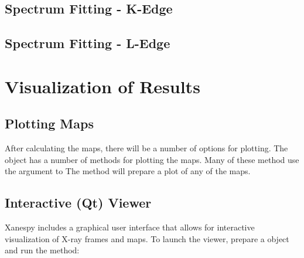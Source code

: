 \documentclass[letterpaper,10pt,english]{sphinxmanual}
\begin{document}
\section{Spectrum Fitting - K-Edge}
\label{\detokenize{analysis:spectrum-fitting-k-edge}}

\section{Spectrum Fitting - L-Edge}
\label{\detokenize{analysis:spectrum-fitting-l-edge}}

\chapter{Visualization of Results}
\label{\detokenize{visualization::doc}}\label{\detokenize{visualization:visualization-of-results}}

\section{Plotting Maps}
\label{\detokenize{visualization:plotting-maps}}
After calculating the maps, there will be a number of options for
plotting. The {\hyperref[\detokenize{xanespy:xanespy.xanes_frameset.XanesFrameset}]{}} object
has a number of methods for plotting the maps. Many of these method
use the  argument to The
{\hyperref[\detokenize{xanespy:xanespy.xanes_frameset.XanesFrameset.plot_map}]{}} method will
prepare a plot of any of the maps.


\section{Interactive (Qt) Viewer}
\label{\detokenize{visualization:interactive-qt-viewer}}
Xanespy includes a graphical user interface that allows for
interactive visualization of X-ray frames and maps. To launch the
viewer, prepare a  object and run the 
method:

\begin{sphinxVerbatim}[commandchars=\\\{\}]
  
\end{sphinxVerbatim}
\end{document}
